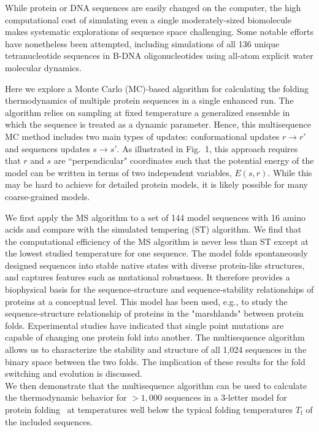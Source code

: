 \documentclass[%
 aip,
rsi,%
 amsmath,amssymb,
 reprint,%
]{revtex4-1}
\newcommand	 {\sbar}	{{s}}
\newcommand	 {\rbar}	{{r}}
\begin{document}
While protein or DNA sequences are easily changed on the computer, the high computational cost of simulating even a single moderately-sized biomolecule makes systematic explorations of sequence space challenging. Some notable efforts have nonetheless been attempted, including simulations of all 136 unique tetranucleotide sequences in B-DNA oligonucleotides using all-atom explicit water molecular dynamics.~\cite{Beveridge2004}

Here we explore a Monte Carlo (MC)-based algorithm for calculating the folding thermodynamics of multiple protein sequences in a single enhanced run. The algorithm relies on sampling at fixed temperature a generalized ensemble in which the sequence is treated as a dynamic parameter. Hence, this multisequence MC method includes two main types of updates: conformational updates $\rbar\rightarrow\rbar'$ and sequences updates $\sbar\rightarrow\sbar'$. As illustrated in Fig.~1, this approach requires that $\rbar$ and $\sbar$ are ``perpendicular" coordinates such that the potential energy of the model can be written in terms of two independent variables, $E(\sbar,\rbar)$. While this may be hard to achieve for detailed protein models, it is likely possible for many coarse-grained models. 

We first apply the MS algorithm to a set of 144 model sequences with 16 amino acids and compare with the simulated tempering (ST) algorithm. We find that the computational efficiency of the MS algorithm is never less than ST except at the lowest studied temperature for one sequence. The model folds spontaneously designed sequences into stable native states with diverse protein-like structures, and captures features such as mutational robustness. It therefore provides a biophysical basis for the sequence-structure and sequence-stability relationships of proteins at a conceptual level. This model has been used, e.g., to study the sequence-structure relationship of proteins in the "marshlands" between protein folds. Experimental studies have indicated that single point mutations are capable of changing one protein fold into another. The multisequence algorithm allows us to characterize the stability and structure of all 1,024 sequences in the binary space between the two folds. The implication of these results for the fold switching and evolution is discussed. \\

We then demonstrate that the multisequence algorithm can be used to calculate the thermodynamic behavior for $>1,000$ sequences in a 3-letter model for protein folding~\cite{Bhattacherjee2012} at temperatures well below the typical folding temperatures $T_\mathrm{f}$ of the included sequences.  
\end{document}

